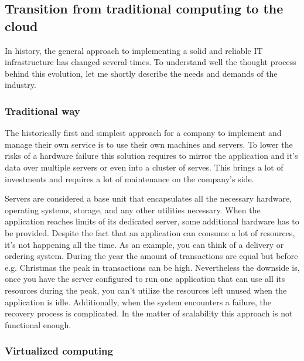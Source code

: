 \subsection{Transition from traditional computing to the cloud}
\label{sub:Transition from traditional computing to the cloud}

In history, the general approach to implementing a solid and reliable IT infrastructure has changed several times. To understand well the thought process behind this evolution, let me shortly describe the needs and demands of the industry.

\subsubsection{Traditional way}
\label{subs:Traditional way}

The historically first and simplest approach for a company to implement and manage their own service is to use their own machines and servers. To lower the risks of a hardware failure this solution requires to mirror the application and it's data over multiple servers or even into a cluster of serves. This brings a lot of investments and requires a lot of maintenance on the company's side.

Servers are considered a base unit that encapsulates all the necessary hardware, operating systems, storage, and any other utilities necessary. When the application reaches limits of its dedicated server, some additional hardware has to be provided. Despite the fact that an application can consume a lot of resources, it's not happening all the time. As an example, you can think of a delivery or ordering system. During the year the amount of transactions are equal but before e.g. Christmas the peak in transactions can be high. Nevertheless the downside is, once you have the server configured to run one application that can use all its resources during the peak, you can't utilize the resources left unused when the application is idle. Additionally, when the system encounters a failure, the recovery process is complicated. In the matter of scalability this approach is not functional enough.

\subsubsection{Virtualized computing}
\label{subs:Virtualized computing}


